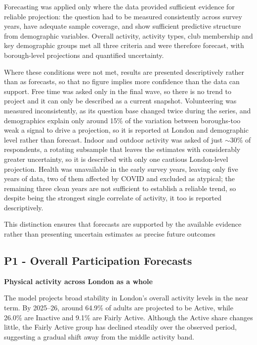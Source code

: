 \documentclass[ %
                    author={Ashrey Ashrey, Sanya Kapoor, Trisha Sharma, Yash Bhooshan Pandloskar},
                supervisor={Dr. Dalila O’Grady},
                    degree={MSc},
                     title={Using machine learning to forecast physical activity participation, volunteering and activity patterns in London},
                  subtitle={},
                      type={},
                      year={2021}]{dissertation}
\begin{document}
Forecasting was applied only where the data provided sufficient evidence for reliable projection: the question had to be measured consistently across survey years, have adequate sample coverage, and show sufficient predictive structure from demographic variables. Overall activity, activity types, club membership and key demographic groups met all three criteria and were therefore forecast, with borough-level projections and quantified uncertainty.

Where these conditions were not met, results are presented descriptively rather than as forecasts, so that no figure implies more confidence than the data can support. Free time was asked only in the final wave, so there is no trend to project and it can only be described as a current snapshot. Volunteering was measured inconsistently, as its question base changed twice during the series, and demographics explain only around 15\% of the variation between boroughs-too weak a signal to drive a projection, so it is reported at London and demographic level rather than forecast. Indoor and outdoor activity was asked of just $\sim$30\% of respondents, a rotating subsample that leaves the estimates with considerably greater uncertainty, so it is described with only one cautious London-level projection. Health was unavailable in the early survey years, leaving only five years of data, two of them affected by COVID and excluded as atypical; the remaining three clean years are not sufficient to establish a reliable trend, so despite being the strongest single correlate of activity, it too is reported descriptively.

This distinction ensures that forecasts are supported by the available evidence rather than presenting uncertain estimates as precise future outcomes

\FloatBarrier
\subsection{P1 - Overall Participation Forecasts}

\noindent
\textbf{Physical activity across London as a whole}

The model projects broad stability in London’s overall activity levels in the near term. By 2025--26, around 64.9\% of adults are projected to be Active, while 26.0\% are Inactive and 9.1\% are Fairly Active. Although the Active share changes little, the Fairly Active group has declined steadily over the observed period, suggesting a gradual shift away from the middle activity band.
\end{document}
